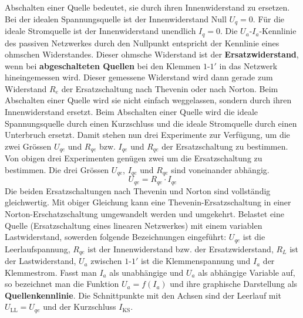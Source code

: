 \newline\newline
Abschalten einer Quelle bedeutet, sie durch ihren Innenwiderstand zu ersetzen. Bei der idealen Spannungsquelle ist der Innenwiderstand Null $U_q=0$. Für die ideale Stromquelle ist der Innenwiderstand unendlich $I_q=0$.
\newline\newline
Die $U_a$-$I_a$-Kennlinie des passiven Netzwerkes durch den Nullpunkt entspricht der Kennlinie eines ohmschen Widerstandes. Dieser ohmsche Widerstand ist der \textbf{Ersatzwiderstand}, wenn bei \textbf{abgeschalteten Quellen} bei den Klemmen $1$-$1'$ in das Netzwerk hineingemessen wird. Dieser gemessene Widerstand wird dann gerade zum Widerstand $R_e$ der Ersatzschaltung nach Thevenin oder nach Norton.
\newline\newline
Beim Abschalten einer Quelle wird sie nicht einfach weggelassen, sondern durch ihren Innenwiderstand ersetzt. Beim Abschalten einer Quelle wird die ideale Spannungsquelle durch einen Kurzschluss und die ideale Stromquelle durch einen Unterbruch ersetzt.
\newline\newline
Damit stehen nun drei Experimente zur Verfügung, um die zwei Grössen $U_{qe}$ und $R_{qe}$ bzw. $I_{qe}$ und $R_{qe}$ der Ersatzschaltung zu bestimmen.
\newline\newline
Von obigen drei Experimenten genügen zwei um die Ersatzschaltung zu bestimmen. Die drei Grössen $U_{qe}$, $I_{qe}$ und $R_{qe}$ sind voneinander abhängig.
\begin{equation}
\boxed{U_{qe}=R_{qe}\cdot I_{qe}}
\end{equation}
Die beiden Ersatzschaltungen nach Thevenin und Norton sind vollständig gleichwertig. Mit obiger Gleichung kann eine Thevenin-Ersatzschaltung in einer Norton-Erschatzschaltung umgewandelt werden und umgekehrt.
\newline\newline
Belastet eine Quelle (Ersatzschaltung eines linearen Netzwerkes) mit einem variablen Lastwiderstand, sowerden folgende Bezeichnungen eingeführt: $U_{qe}$ ist die Leerlaufspannung, $R_{qe}$ ist der Innenwiderstand bzw. der Ersatzwiderstand, $R_L$ ist der Lastwiderstand, $U_a$ zwischen $1$-$1'$ ist die Klemmenspannung und $I_a$ der Klemmestrom.
\newline\newline
Fasst man $I_a$ als unabhängige und $U_a$ als abhängige Variable auf, so bezeichnet man die Funktion $U_a=f\left(I_a\right)$ und ihre graphische Darstellung als \textbf{Quellenkennlinie}. Die Schnittpunkte mit den Achsen sind der Leerlauf mit $U_{\text{LL}}=U_{qe}$ und der Kurzschluss $I_{\text{KS}}$.
